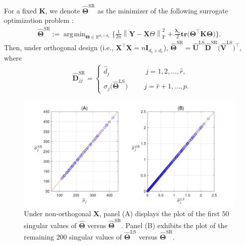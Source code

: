 \documentclass[alpha-refs]{wiley-article}
\DeclareMathOperator*{\argmin}{\arg\!\min}
\begin{document}
\begin{proposition} \label{surrogate}
    For a fixed $\boldsymbol{K}$, we denote $\widehat{\boldsymbol{\Theta}}^{\text{SR}}$ as the minimizer of the following surrogate optimization problem :
    \begin{align} \label{closed_form}
        \widehat{\boldsymbol{\Theta}}^{\text{SR}} :=
        \argmin_{\boldsymbol{\Theta}\in\mathbb{R}^{d_{1} \times d_{2}}} \Bigg\{ \frac{1}{2n} \left\| \boldsymbol{Y}-\boldsymbol{X}\Theta \right\|_{\text{F}}^{2} + \frac{\boldsymbol{\lambda}_{n}}{2}
        \textbf{tr}\big(\boldsymbol{\Theta}^{\top} \boldsymbol{K} \boldsymbol{\Theta} \big) \Bigg\}.
    \end{align}
    Then, under orthogonal design (i.e., $\boldsymbol{X}^{\top}\boldsymbol{X}=n\boldsymbol{I}_{d_{1} \times d_{1}}$),
    $\widehat{\boldsymbol{\Theta}}^{\text{SR}} = \widehat{\boldsymbol{U}}^{\text{LS}}\widehat{\boldsymbol{D}}^{\text{SR}}\big(\widehat{\boldsymbol{V}}^{\text{LS}}\big)^{\top}$, where
    \begin{align*}
        &\widehat{\boldsymbol{D}}^{\text{SR}}_{jj} =
        \begin{cases}
            \widehat{d}_{j} \qquad \qquad \quad \, j = 1,2,\dots,\widehat{r}, \\
            \sigma_{j}\big(\widehat{\boldsymbol{\Theta}}^{\text{LS}} \big)
            \quad \,\,\,\,\,\,\,\, j = \widehat{r}+1,\dots,p.
        \end{cases}
    \end{align*}
\end{proposition}

\begin{figure} [b!]
  \includegraphics[width=120mm]{Figure/Fig2.pdf}
  \centering
  \caption{ Under non-orthogonal $\boldsymbol{X}$, panel (A) displays the plot of the first $50$ singular values of $\widehat{\boldsymbol{\Theta}}$ versus $\widehat{\boldsymbol{\Theta}}^{\text{SR}}$.
  Panel (B) exhibits the plot of the remaining $200$ singular values of $\widehat{\boldsymbol{\Theta}}^{\text{LS}}$ versus $\widehat{\boldsymbol{\Theta}}^{\text{SR}}$.}
  \label{Fig2}
\end{figure}
\end{document}
